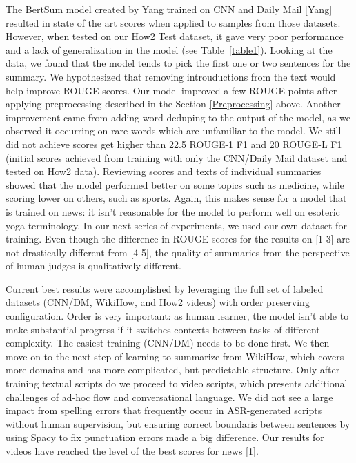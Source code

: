 \documentclass{article}
\begin{document}
The BertSum model created by Yang trained on CNN and Daily Mail [Yang] resulted in state of the art scores when applied to samples from those datasets. However, when tested on our How2 Test dataset, it gave very poor performance and a lack of generalization in the model (see Table~\ref{table1}). Looking at the data, we found that the model tends to pick the first one or two sentences for the summary.  We hypothesized that removing introuductions from the text would help improve ROUGE scores. Our model improved a few ROUGE points after applying  preprocessing described in the Section \ref{Preprocessing} above. Another improvement came from adding word deduping to the output of the model, as we observed it occurring on rare words which are unfamiliar to the model. We still did not achieve scores get higher than 22.5 ROUGE-1 F1 and 20 ROUGE-L F1 (initial scores achieved from training with only the CNN/Daily Mail dataset and tested on How2 data). Reviewing scores and texts of individual summaries showed that the model performed better on some topics such as medicine, while scoring lower on others, such as sports. Again, this makes sense for a model that is trained on news: it isn't reasonable for the model to perform well on esoteric yoga terminology. In our next series of experiments, we used our own dataset for training.  Even though the difference in ROUGE scores for the results on [1-3] are not drastically different from [4-5], the quality of summaries from the perspective of human judges is qualitatively different.

Current best results were accomplished by leveraging the full set of labeled datasets (CNN/DM, WikiHow, and How2 videos) with order preserving configuration. Order is very important: as human learner, the model isn't able to make substantial progress if it switches contexts between tasks of different complexity. The easiest training (CNN/DM) needs to be done first. We then move on to the next step of learning to summarize from WikiHow, which covers more domains and has more complicated, but predictable structure. Only after training textual scripts do we proceed to video scripts, which presents additional challenges of ad-hoc flow and conversational language. We did not see a large impact from spelling errors that frequently occur in ASR-generated scripts without human supervision, but ensuring correct boundaris between sentences by using Spacy to fix punctuation errors made a big difference. Our results for videos have reached the level of the best scores for news [1]. 
\end{document}
